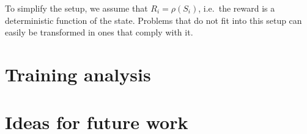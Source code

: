 \documentclass[a4paper,12pt]{amsart}
\begin{document}
To simplify the setup, we assume that $R_i = \rho(S_i)$, i.e.\ the reward is a 
deterministic function of the state. Problems that do not fit into this 
setup can easily be transformed in ones that comply with it. 



\section{Training analysis}

\section{Ideas for future work}

\printbibliography
\end{document}
